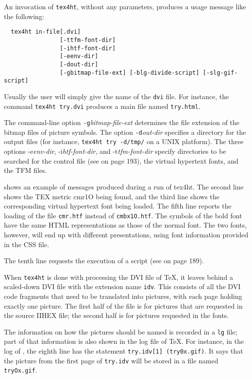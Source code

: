 An invocation of \verb|tex4ht|, without any parameters, produces a usage message 
like the following: 

\begin{verbatim}
  tex4ht in-file[.dvi] 
				[-ttfm-font-dir] 
				[-ihtf-font-dir] 
				[-eenv-dir] 
				[-dout-dir] 
				[-gbitmap-file-ext] [-blg-divide-script] [-slg-gif-script] 
\end{verbatim}

Usually the user will simply give the name of the \verb|dvi| file. For instance, the 
command \verb|tex4ht try.dvi| produces a main file named \verb|try.html|. 

The command-line option \verb|-g|\emph{bitmap-file-ext} determines the
file extension of the bitmap files of picture symbols. The option
\verb|-d|\emph{out-dir} specifies a directory for the output files (for
instance, \verb|tex4ht try -d/tmp/| on a UNIX platform). The three
options -e\emph{env-dir}, -i\emph{htf-font-dir}, and
-t\emph{tfm-font-dir} specify directories to be searched for the control
file (see  on page 193), the virtual hypertext fonts, and
the TFM files. 

 shows an example of messages produced during a run of
tex4ht.  The second line shows the TEX metric cmr1O being found, and the
third line shows the corresponding virtual hypertext font being loaded.
The fifth line reports the loading of the file \verb|cmr.htf| instead of
\verb|cmbx1O.htf|. The symbols of the bold font have the same HTML
representations as those of the normal font. The two fonts, however,
will end up with different presentations, using font information
provided in the CSS file. 

The tenth line requests the execution of a script (see  on page 189). 


When \verb|tex4ht| is done with processing the DVI file of \TeX, it
leaves behind a scaled-down DVI file with the extension name \verb|idv|.
This consists of all the DVI code fragments that need to be translated
into pictures, with each page holding exactly one picture. The first
half of the file is for pictures that are requested in the source IIHEX
file; the second half is for pictures requested in the fonts. 


The information on how the pictures should be named is recorded in a
\verb|lg| file; part of that information is also shown in the log file
of \TeX. For instance, in the log of , the eighth line has
the statement \verb|try.idv[1] (try0x.gif)|. It says that the picture
from the first page of \verb|try.idv| will be stored in a file named
\verb|tryOx.gif|. 

